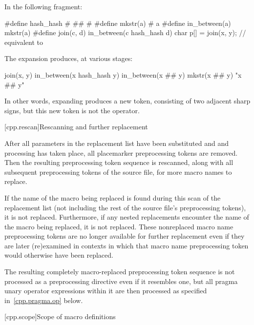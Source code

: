 \begin{example} In the following fragment:

\begin{codeblock}
#define hash_hash # ## #
#define mkstr(a) # a
#define in_between(a) mkstr(a)
#define join(c, d) in_between(c hash_hash d)
char p[] = join(x, y);          // equivalent to 
\end{codeblock}

The expansion produces, at various stages:

\begin{codeblock}
join(x, y)
in_between(x hash_hash y)
in_between(x ## y)
mkstr(x ## y)
"x ## y"
\end{codeblock}

In other words, expanding  produces a new token,
consisting of two adjacent sharp signs, but this new token is not the
\tcode{\#\#} operator. \end{example}

[cpp.rescan]{Rescanning and further replacement}%
%

\pnum
After all parameters in the replacement list have been substituted and \tcode{\#} and \tcode{\#\#} processing has taken
place, all placemarker preprocessing tokens are removed. Then
the resulting preprocessing token sequence is rescanned, along with all
subsequent preprocessing tokens of the source file, for more macro names
to replace.

\pnum
If the name of the macro being replaced is found during this scan of
the replacement list
(not including the rest of the source file's preprocessing tokens),
it is not replaced.
Furthermore,
if any nested replacements encounter the name of the macro being replaced,
it is not replaced.
These nonreplaced macro name preprocessing tokens are no longer available
for further replacement even if they are later (re)examined in contexts
in which that macro name preprocessing token would otherwise have been
replaced.

\pnum
The resulting completely macro-replaced preprocessing token sequence
is not processed as a preprocessing directive even if it resembles one,
but all pragma unary operator expressions within it are then processed as
specified in~\ref{cpp.pragma.op} below.

[cpp.scope]{Scope of macro definitions}%
%


